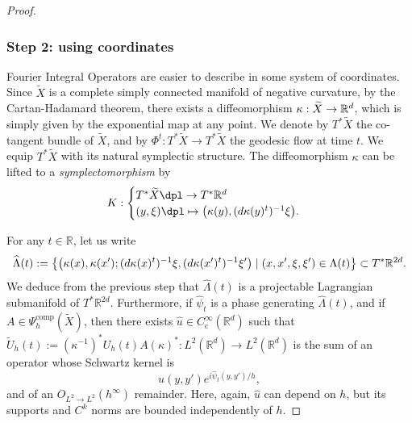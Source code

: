 \documentclass[JEP,XML,SOM,Unicode,published]{cedram}
\newcommand\mto{\mathchoice{\longmapsto}{\mapsto}{\mapsto}{\mapsto}}
\let\sep\mid
\newcommand{\rc}{\mathrm{c}}
\newcommand{\comp}{\mathrm{comp}}
\theoremstyle{plain}
\theoremstyle{definition}
\newcommand{\R}{\mathbb{R}}
\begin{document}
\begin{proof}
\subsubsection*{Step 2: using coordinates}
Fourier Integral Operators are easier to describe in some system of coordinates. Since $\widetilde{X}$ is a complete simply connected manifold of negative curvature, by the Cartan-Hadamard theorem, there exists a diffeomorphism $\kappa : \widetilde{X} \to\nobreak \R^d$, which is simply given by the exponential map at any point. We denote by $T^*\widetilde{X}$ the co-tangent bundle of $\widetilde{X}$, and by $\Phi^t : T^*\widetilde{X}\to T^* \widetilde{X}$ the geodesic flow at time $t$. We equip $T^*\widetilde{X}$ with its natural symplectic structure. The diffeomorphism $\kappa$ can be lifted to a \emph{symplectomorphism} by
\begin{equation}\label{eq:SymplLift}
K :
\begin{cases}
T^* \widetilde{X} \dpl\to T^* \R^d \\
(y,\xi)\dpl\mto \big{(}\kappa(y), (d\kappa(y)^t)^{-1}\xi\big{)}.
\end{cases}
\end{equation}

For any $t\in \R$, let us write
\[
\widehat{\Lambda}(t):= \left\{\big{(}\kappa(x), \kappa(x') ; (d\kappa(x)^t)^{-1}\xi, (d\kappa(x')^t)^{-1}\xi'\big{)} \sep (x,x',\xi,\xi')\in \Lambda(t) \right\}\subset T^*\R^{2d}.
\]
We deduce from the previous step that $\widehat{\Lambda}(t)$ is a projectable Lagrangian submanifold of $T^*\R^{2d}$.
Furthermore, if $\widehat{\psi}_t$ is a phase generating $\widehat{\Lambda}(t)$,
and if $A\in \Psi_h^{\comp}(\widetilde{X})$, then there exists $\widehat{u}\in C_\rc^\infty(\R^d)$ such that
$\tilde{U}_h(t):= (\kappa^{-1})^* U_h(t)A (\kappa)^* : L^2(\R^d)\to L^2(\R^d)$
is the sum of an operator whose Schwartz kernel is
\begin{equation}\label{eq:IntKer}
\widehat{u}(y,y') e^{i\widehat{\psi}_t(y,y')/h},
\end{equation}
and of an $O_{L^2\to L^2}(h^\infty)$ remainder. Here, again, $\widehat{u}$ can depend on $h$, but its supports and $C^k$ norms are bounded independently of $h$.


\end{proof}
\end{document}
